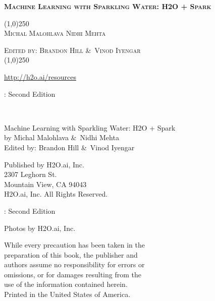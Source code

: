 


%
%
\usepackage{tabularx}
\usepackage{booktabs}
\usepackage{forest}
\usepackage{url}
\def\UrlBreaks{\do\/\do-\do_\do.}



\thispagestyle{empty} %

\begin{center}
\textsc{\large\bf{Machine Learning with Sparkling Water: H2O + Spark}}

\bigskip
\line(1,0){250}  %
\\
\bigskip
\textsc{\small{Michal Malohlava\hspace{20pt} Nidhi Mehta}}

\textsc{\small{Edited by: Brandon Hill \&\ Vinod Iyengar}}
\\
\bigskip
\line(1,0){250}  %


{\url{http://h2o.ai/resources}}

\bigskip
\monthname \hspace{1pt}  \the\year: Second Edition 
\\%
\bigskip
\end{center}

\newpage
\null\vfill %

\thispagestyle{empty}%


{\raggedright\vfill\ 

Machine Learning with Sparkling Water: H2O + Spark\\
  by Michal Malohlava \&\ Nidhi Mehta\\
  Edited by: Brandon Hill \&\ Vinod Iyengar
  
\bigskip
  Published by H2O.ai, Inc. \\
2307 Leghorn St. \\
Mountain View, CA 94043\\
\bigskip
\textcopyright \hspace{1pt} \the\year H2O.ai, Inc. All Rights Reserved. 
\bigskip

\monthname \hspace{1pt}  \the\year: Second Edition
\bigskip

Photos by \textcopyright H2O.ai, Inc. 
\bigskip

While every precaution has been taken in the\\
preparation of this book, the publisher and\\
authors assume no responsibility for errors or\\
omissions, or for damages resulting from the\\
use of the information contained herein.\\
\bigskip
Printed in the United States of America. 


}\par


